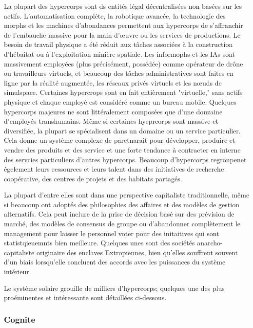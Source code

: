                La plupart des hypercorps sont ds entités légal décentralisées non basées sur les actifs. L'automatisation complète, la robotique avancée, la technologie des morphs et les machines d'abondances permettent aux hypercorps de s'affranchir de l'embauche massive pour la main d'œuvre ou les services de productions. Le besoin de travail physique a été réduit aux tâches associées à la construction d'hébaitat ou à l'exploitation minière spatiale. Les informophs et les IAs sont massivement employées (plus précisément, possédée) comme opérateur de drône ou travailleurs virtuels, et beaucoup des tâches administratives sont faites en ligne par la réalité augmentée, les réseaux privés virtuels et les nœuds de simulspace. Certaines hypercrops sont en fait entièrement "virtuelle," sans actifs physique et chaque employé est considéré comme un bureau mobile. Quelques hypercorps majeures ne sont littéralement composées que d'une douzaine d'employés transhumains. Même si certaines hyeprcorps sont massive et diversifiée, la plupart se spécialisent dans un domaine ou un service particulier. Cela donne un système complexe de paretnarait pour développer, produire et vendre des produits et des service et une forte tendance à contracter en interne des servcies particuliers d'autres hypercorps. Beaucoup d'hypercorps regroupenet égelement leurs ressources et leurs talent dans des initiatives de recherche coopérative, des centres de projets et des habitats partagés. 

               La plupart d'entre elles sont dans une perspective capitaliste traditionnelle, même si beaucoup ont adoptés des philosophies des affaires et des modèles de gestion alternatifs. Cela peut inclure de la prise de décision basé sur des prévision de marché, des modèles de consensus de groupe ou d'abandonner complètement le management pour laisser le personnel voter pour des initaitives qui sont statistqieuemnts bien meilleure. Quelques unes sont des sociétés anarcho-capitaliste originaire des enclaves Extropiennes, bien qu'elles souffrent souvent d'un biais lorsqu'elle concluent des accords avec les puissances du système intérieur. 

               Le système solaire grouille de milliers d'hypercorps; quelques une des plus proéminentes et intéressante sont détaillées ci-dessous. 

               \subsubsection{Cognite} \label{sec:cognite} 

